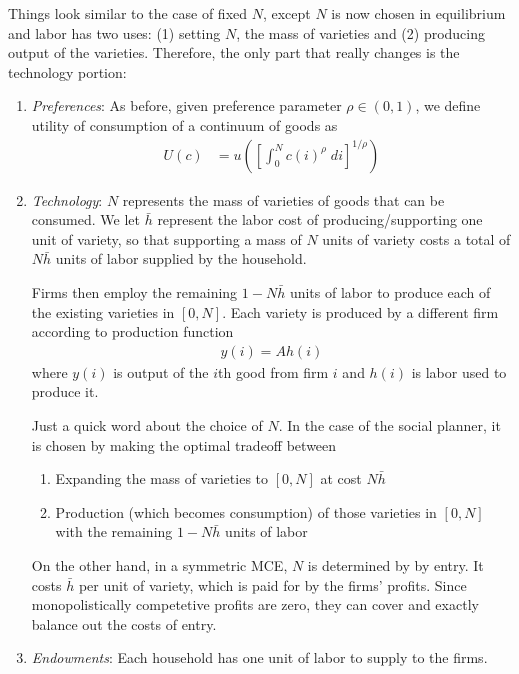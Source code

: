 \documentclass[12pt]{article}
\theoremstyle{plain}
\theoremstyle{definition}
\theoremstyle{remark}
\begin{document}
Things look similar to the case of fixed $N$, except $N$ is now chosen
in equilibrium and labor has two uses: (1) setting $N$, the mass of
varieties and (2) producing output of the varieties. Therefore, the only
part that really changes is the technology portion:
\begin{enumerate}
  \item \emph{Preferences}:
    As before, given preference parameter $\rho\in(0,1)$, we define
    utility of consumption of a continuum of goods as
    \begin{align*}
      U(c) &=
      u\left(
      \left[
      \int_0^N c(i)^\rho \; di
      \right]^{1/\rho}
      \right)
    \end{align*}

  \item \emph{Technology}:
    $N$ represents the mass of varieties of goods that can be consumed.
    We let $\bar{h}$ represent the labor cost of producing/supporting
    one unit of variety, so that supporting a mass of $N$ units of
    variety costs a total of $N\bar{h}$ units of labor supplied by the
    household.

    Firms then employ the remaining $1-N\bar{h}$ units of labor to
    produce each of the existing varieties in $[0,N]$. Each variety is
    produced by a different firm according to production function
    \begin{align*}
      y(i) = A h(i)
    \end{align*}
    where $y(i)$ is output of the $i$th good from firm $i$ and $h(i)$ is
    labor used to produce it.

    Just a quick word about the choice of $N$.
    In the case of the social planner, it is chosen by making the
    optimal tradeoff between
    \begin{enumerate}
      \item Expanding the mass of varieties to $[0,N]$ at cost
        $N\bar{h}$
      \item Production (which becomes consumption) of those varieties in
        $[0,N]$ with the remaining $1-N\bar{h}$ units of labor
    \end{enumerate}
    On the other hand, in a symmetric MCE, $N$ is determined by by
    entry. It costs $\bar{h}$ per unit of variety, which is paid for by
    the firms' profits. Since monopolistically competetive profits are
    zero, they can cover and exactly balance out the costs of entry.

  \item \emph{Endowments}: Each household has one unit of labor to
    supply to the firms.
\end{enumerate}
\end{document}
